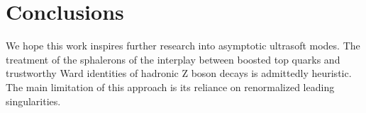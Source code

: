 \section{Conclusions}\label{sec:conclusions}

We hope this work inspires further research into asymptotic ultrasoft
modes. The treatment of the sphalerons of the interplay between boosted
top quarks and trustworthy Ward identities of hadronic Z boson decays is
admittedly heuristic. The main limitation of this approach is its
reliance on renormalized leading singularities.

